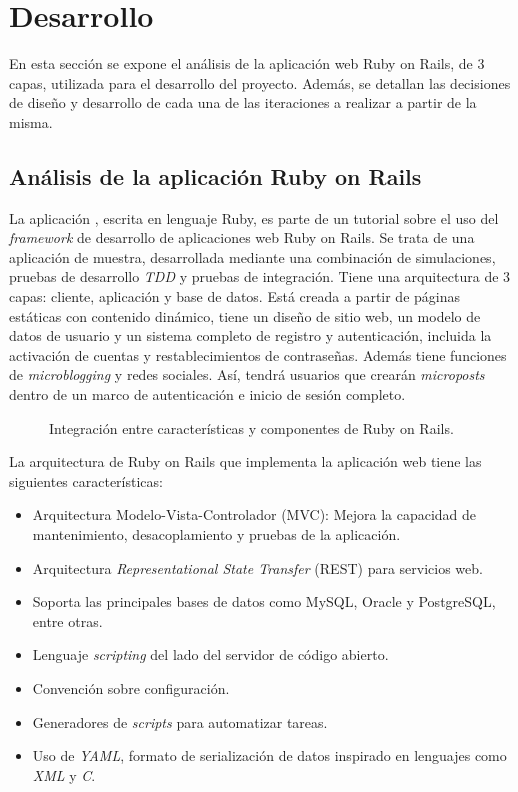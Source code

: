 \chapter{Desarrollo}
\label{cha:regulation}

En esta sección se expone el análisis de la aplicación web Ruby on Rails, de 3 capas, utilizada para el desarrollo del proyecto. Además, se detallan las decisiones de diseño y desarrollo de cada una de las iteraciones a realizar a partir de la misma.

\section{Análisis de la aplicación Ruby on Rails}

La aplicación , escrita en lenguaje Ruby, es parte de un tutorial sobre el uso del \textit{framework} de desarrollo de aplicaciones web Ruby on Rails. Se trata de una aplicación de muestra, desarrollada mediante una combinación de simulaciones, pruebas de desarrollo \textit{TDD} y pruebas de integración. Tiene una arquitectura de 3 capas: cliente, aplicación y base de datos. Está creada a partir de páginas estáticas con contenido dinámico, tiene un diseño de sitio web, un modelo de datos de usuario y un sistema completo de registro y autenticación, incluida la activación de cuentas y restablecimientos de contraseñas. Además tiene funciones de \textit{microblogging} y redes sociales. Así, tendrá usuarios que crearán \textit{microposts} dentro de un marco de autenticación e inicio de sesión completo.

\begin{figure}[H]
\caption{Integración entre características y componentes de Ruby on Rails.\label{fig:figure_placement_example}}
\end{figure}

La arquitectura de Ruby on Rails que implementa la aplicación web tiene las siguientes características:
\begin{itemize}
\item Arquitectura Modelo-Vista-Controlador (MVC): Mejora la capacidad de mantenimiento, desacoplamiento y pruebas de la aplicación.
\item Arquitectura \textit{Representational State Transfer} (REST) para servicios web.
\item Soporta las principales bases de datos como MySQL, Oracle y PostgreSQL, entre otras.
\item Lenguaje \textit{scripting} del lado del servidor de código abierto.
\item Convención sobre configuración.
\item Generadores de \textit{scripts} para automatizar tareas.
\item Uso de \textit{YAML}, formato de serialización de datos inspirado en lenguajes como \textit{XML} y \textit{C}.
\end{itemize}

